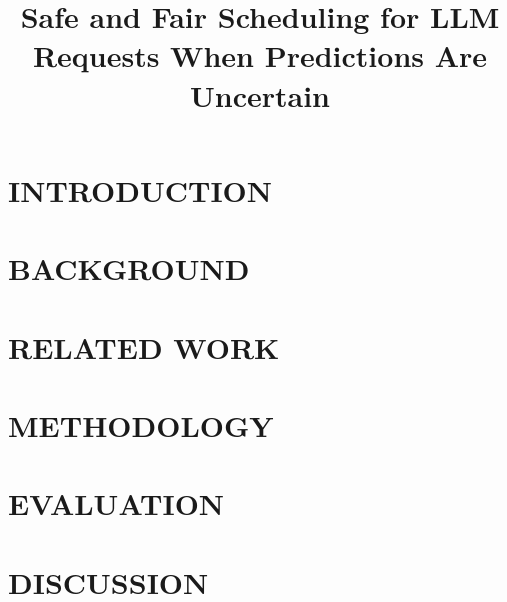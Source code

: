 \documentclass[conference]{IEEEtran}
\begin{document}

\title{Safe and Fair Scheduling for LLM Requests When Predictions Are Uncertain}


\author{



}

\maketitle



\section{INTRODUCTION}


\section{BACKGROUND}


\section{RELATED WORK}


\section{METHODOLOGY}


\section{EVALUATION}


\section{DISCUSSION}

\end{document}
